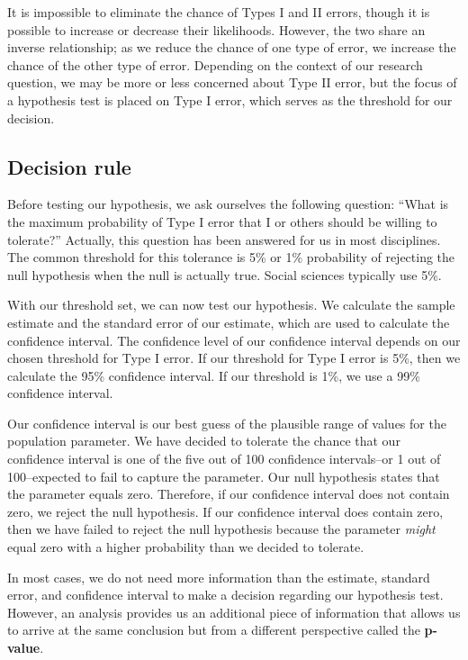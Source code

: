 \documentclass[
]{book}
\begin{document}
It is impossible to eliminate the chance of Types I and II errors, though it is possible to increase or decrease their likelihoods. However, the two share an inverse relationship; as we reduce the chance of one type of error, we increase the chance of the other type of error. Depending on the context of our research question, we may be more or less concerned about Type II error, but the focus of a hypothesis test is placed on Type I error, which serves as the threshold for our decision.

\hypertarget{decision-rule}{%
\subsection{Decision rule}\label{decision-rule}}

Before testing our hypothesis, we ask ourselves the following question: ``What is the maximum probability of Type I error that I or others should be willing to tolerate?'' Actually, this question has been answered for us in most disciplines. The common threshold for this tolerance is 5\% or 1\% probability of rejecting the null hypothesis when the null is actually true. Social sciences typically use 5\%.

With our threshold set, we can now test our hypothesis. We calculate the sample estimate and the standard error of our estimate, which are used to calculate the confidence interval. The confidence level of our confidence interval depends on our chosen threshold for Type I error. If our threshold for Type I error is 5\%, then we calculate the 95\% confidence interval. If our threshold is 1\%, we use a 99\% confidence interval.

Our confidence interval is our best guess of the plausible range of values for the population parameter. We have decided to tolerate the chance that our confidence interval is one of the five out of 100 confidence intervals--or 1 out of 100--expected to fail to capture the parameter. Our null hypothesis states that the parameter equals zero. Therefore, if our confidence interval does not contain zero, we reject the null hypothesis. If our confidence interval does contain zero, then we have failed to reject the null hypothesis because the parameter \emph{might} equal zero with a higher probability than we decided to tolerate.

In most cases, we do not need more information than the estimate, standard error, and confidence interval to make a decision regarding our hypothesis test. However, an analysis provides us an additional piece of information that allows us to arrive at the same conclusion but from a different perspective called the \textbf{p-value}.
\end{document}
